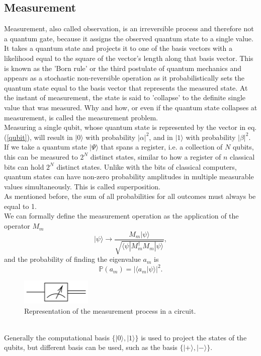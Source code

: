 \subsection{Measurement}
Measurement, also called observation, is an irreversible process and therefore not a quantum gate, because it assigns the observed quantum state to a single value. It takes a quantum state and projects it to one of the basis vectors with a likelihood equal to the square of the vector's length along that basis vector. This is known as the 'Born rule' or the third postulate of quantum mechanics and appears as a stochastic non-reversible operation as it probabilistically sets the quantum state equal to the basis vector that represents the measured state. At the instant of measurement, the state is said to 'collapse' to the definite single value that was measured. Why and how, or even if the quantum state collapses at measurement, is called the measurement problem. \\
Measuring a single qubit, whose quantum state is represented by the vector in eq. (\ref{qubit}), will result in $|0\rangle$ with probability $|\alpha|^{2}$, and in $|1\rangle$ with probability $|\beta|^2$. \\
If we take a quantum state $|\Psi \rangle$ that spans a register, i.e. a collection of $N$ qubits, this can be measured to $2^{N}$ distinct states, similar to how a register of $n$ classical bits can hold $2^{N}$ distinct states. Unlike with the bits of classical computers, quantum states can have non-zero probability amplitudes in multiple measurable values simultaneously. This is called superposition. \\
As mentioned before, the sum of all probabilities for all outcomes must always be equal to 1. \\
We can formally define the measurement operation as the application of the operator $M_m$
\begin{equation}
    |\psi\rangle \rightarrow \frac{M_m |\psi\rangle}{\sqrt{\langle\psi|M_m^\dagger M_m|\psi\rangle}},
\end{equation}
and the probability of finding the eigenvalue $a_m$ is
\begin{equation}
    \mathbb{P}(a_m) = |\langle a_m|\psi \rangle|^2.
\end{equation}
\begin{figure}[ht]
  \centering
  \includegraphics[width=0.3\textwidth]{figures/Measurement.png}
  \caption{Representation of the measurement process in a circuit.}
\end{figure} \\
Generally the computational basis $\{ |0\rangle,|1\rangle \}$ is used to project the states of the qubits, but different basis can be used, such as the basis $\{ |+\rangle,|-\rangle \}$.

